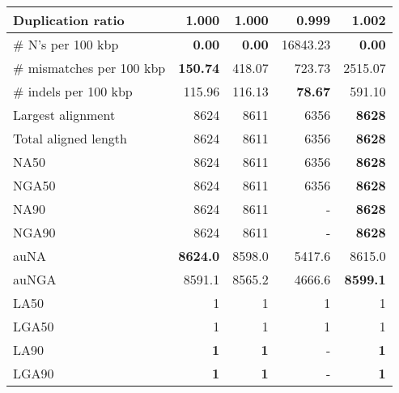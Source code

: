 \documentclass[12pt,a4paper]{article}
\begin{document}
\begin{table}[ht]
\begin{center}
\begin{tabular}{|l*{4}{|r}|}
Duplication ratio & 1.000 & 1.000 & {\bf 0.999} & 1.002 \\ \hline
\# N's per 100 kbp & {\bf 0.00} & {\bf 0.00} & 16843.23 & {\bf 0.00} \\ \hline
\# mismatches per 100 kbp & {\bf 150.74} & 418.07 & 723.73 & 2515.07 \\ \hline
\# indels per 100 kbp & 115.96 & 116.13 & {\bf 78.67} & 591.10 \\ \hline
Largest alignment & 8624 & 8611 & 6356 & {\bf 8628} \\ \hline
Total aligned length & 8624 & 8611 & 6356 & {\bf 8628} \\ \hline
NA50 & 8624 & 8611 & 6356 & {\bf 8628} \\ \hline
NGA50 & 8624 & 8611 & 6356 & {\bf 8628} \\ \hline
NA90 & 8624 & 8611 & - & {\bf 8628} \\ \hline
NGA90 & 8624 & 8611 & - & {\bf 8628} \\ \hline
auNA & {\bf 8624.0} & 8598.0 & 5417.6 & 8615.0 \\ \hline
auNGA & 8591.1 & 8565.2 & 4666.6 & {\bf 8599.1} \\ \hline
LA50 & 1 & 1 & 1 & 1 \\ \hline
LGA50 & 1 & 1 & 1 & 1 \\ \hline
LA90 & {\bf 1} & {\bf 1} & - & {\bf 1} \\ \hline
LGA90 & {\bf 1} & {\bf 1} & - & {\bf 1} \\ \hline
\end{tabular}
\end{center}
\end{table}
\end{document}
